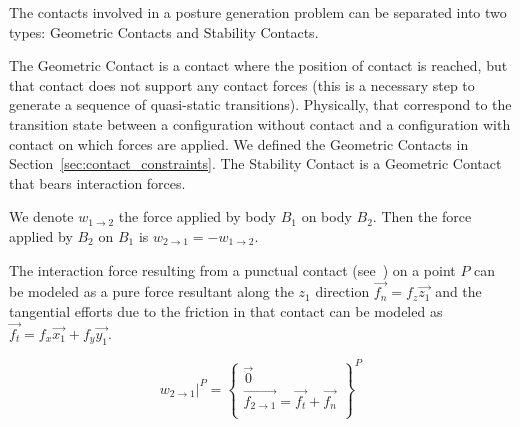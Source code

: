 
The contacts involved in a posture generation problem can be separated into two types: Geometric Contacts and Stability Contacts.

The Geometric Contact is a contact where the position of contact is reached, but that contact does not support any contact forces (this is a necessary step to generate a sequence of quasi-static transitions).
Physically, that correspond to the transition state between a configuration without contact and a configuration with contact on which forces are applied.
We defined the Geometric Contacts in Section~\ref{sec:contact_constraints}.
The Stability Contact is a Geometric Contact that bears interaction forces.


We denote $w_{1\rightarrow 2}$ the force applied by body $B_1$ on body $B_2$.
Then the force applied by $B_2$ on $B_1$ is $w_{2\rightarrow 1} = -w_{1\rightarrow 2}$.

The interaction force resulting from a punctual contact (see~) on a point $P$ can be modeled as a pure force resultant along the $z_1$ direction $\vec{f_n} = f_z \vec{z_1}$ and the tangential efforts due to the friction in that contact can be modeled as $\vec{f_t} = f_x \vec{x_1} + f_y \vec{y_1}$.

\begin{equation}
\label{eq:punctual_force}
\left. w_{2\rightarrow 1}\right|^P = \left\{
  \begin{array}{l}
    \vec{0} \\
    \overrightarrow{f_{2\rightarrow 1}} = \vec{f_t} + \vec{f_n} \\
  \end{array}
  \right\}^P
\end{equation}

